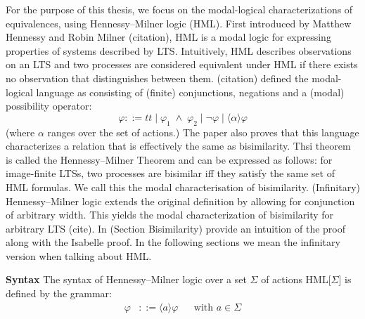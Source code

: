 %
\begin{isabellebody}%
%
%
\isadelimtheory
%
\endisadelimtheory
%
\isatagtheory
%
\endisatagtheory
{\isafoldtheory}%
%
\isadelimtheory
%
\endisadelimtheory
%
\isadelimdocument
%
\endisadelimdocument
%
\isatagdocument
%
\isamarkuptrue%
%
\endisatagdocument
{\isafolddocument}%
%
\isadelimdocument
%
\endisadelimdocument
%
\begin{isamarkuptext}%
For the purpose of this thesis, we focus on the modal-logical characterizations of equivalences, using Hennessy--Milner logic (HML). 
First introduced by Matthew Hennessy and Robin Milner (citation), HML is a modal logic for expressing properties of systems described by LTS.
Intuitively, HML describes observations on an LTS and two processes are considered equivalent under HML if there exists no observation that distinguishes between them.
(citation) defined the modal-logical language as consisting of (finite) conjunctions, negations and a (modal) possibility operator:
$$\varphi ::= t\!t \mid \varphi_1 \;\wedge\; \varphi_2 \mid \neg\varphi \mid \langle\alpha\rangle\varphi$$
(where $\alpha$ ranges over the set of actions.) The paper also proves that this language characterizes a relation that is effectively the same as bisimilarity. 
Thsi theorem is called the Hennessy--Milner Theorem and can be expressed as follows: for image-finite LTSs, two processes are bisimilar iff they satisfy the same set of HML formulas. We call this the modal characterisation of
bisimilarity. (Infinitary) Hennessy--Milner logic extends the original definition by allowing for conjunction of arbitrary width. 
This yields the modal characterization of bisimilarity for arbitrary LTS (cite). In (Section Bisimilarity) provide an intuition of the proof along with the Isabelle proof.
In the following sections we mean the infinitary version when talking about HML.%
\end{isamarkuptext}\isamarkuptrue%
%
\isadelimdocument
%
\endisadelimdocument
%
\isatagdocument
%
\isamarkuptrue%
%
\endisatagdocument
{\isafolddocument}%
%
\isadelimdocument
%
\endisadelimdocument
%
\begin{isamarkuptext}%
\textbf{Syntax} The syntax of Hennessy--Milner logic over a set $\Sigma$ of actions HML[$\Sigma$] is defined by the grammar:
\begin{align*}
    \varphi &::= \langle a \rangle \varphi && \text{with } a \in \Sigma \\

\end{align*}
\end{isamarkuptext}
\end{isabellebody}
